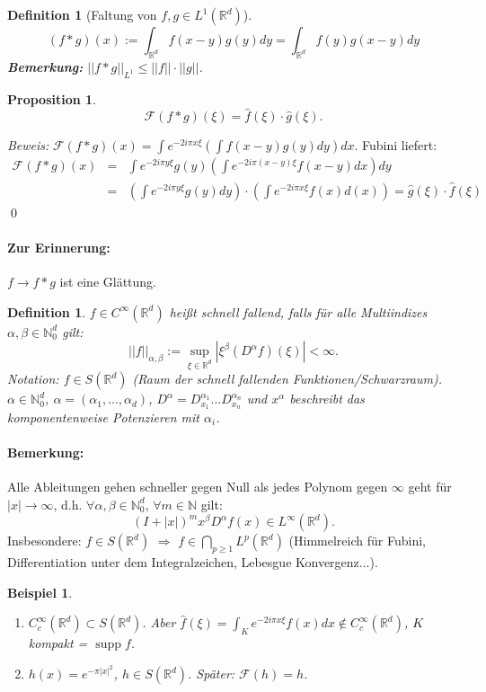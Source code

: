 \documentclass[12pt]{extreport} %
\newtheorem{Definition}[Satz]{Definition}
\newtheorem{Beispiel}[Satz]{Beispiel}
\newtheorem{Prop}[Satz]{Proposition}
\DeclareMathOperator{\supp}{supp}
\numberwithin{equation}{section}
\newcommand{\R}{\mathbb{R}} %
\newcommand{\N}{\mathbb{N}} %
\newcommand{\f}{\hat{f}}
\newcommand{\g}{\hat{g}}
\newcommand{\F}{\mathcal{F}}
\newcommand{\m}{\cdot}
\newcommand{\Bew}{\emph{Beweis: }}
\begin{document}
	\begin{Definition}[Faltung von $f,g\in L^1(\R^d)$]
		$$(f*g)(x):= \int_{\R^d}f(x-y)g(y)dy = \int_{\R^d}f(y) g(x-y) dy$$
		\textbf{Bemerkung:} $||f*g||_{L^1}\leq ||f||\m ||g||$.
	\end{Definition}
	
	\begin{Prop}
		$$\F(f*g)(\xi) = \f(\xi)\m \g(\xi).$$
	\end{Prop}
	
	\Bew $\F(f*g)(x) = \int e^{-2i\pi x\xi}(\int f(x-y)g(y)dy)dx$. Fubini liefert:
	\begin{eqnarray}
		\F(f*g)(x) &=& \int e^{-2i\pi y\xi}g(y) (\int e^{-2i\pi (x-y)\xi}f(x-y)dx)dy\nonumber\\
		&=&(\int e^{-2i\pi y\xi}g(y)dy)\m(\int e^{-2i\pi x\xi}f(x)d(x)) = \g(\xi)\m \f(\xi)\nonumber
	\end{eqnarray}
	\qed
	
	\paragraph{Zur Erinnerung:} $f\rightarrow f*g$ ist eine Glättung.
	
	\begin{Definition}
		$f\in C^{\infty}(\R^d)$ heißt schnell fallend, falls für alle Multiindizes $\alpha,\beta \in \N_0^d$ gilt: 
		$$||f||_{\alpha,\beta} := \sup_{\xi\in \R^d}|\xi^\beta(D^\alpha f)(\xi)| <\infty.$$
		Notation: $f\in S(\R^d)$ (Raum der schnell fallenden Funktionen/Schwarzraum). $\alpha\in \N_0^d$, $\alpha = (\alpha_1,...,\alpha_d)$, $D^\alpha = D_{x_1}^{\alpha_1}...D_{x_n}^{\alpha_n}$ und $x^\alpha$ beschreibt das komponentenweise Potenzieren mit $\alpha_i$.
	\end{Definition}
	
	\paragraph{Bemerkung:} Alle Ableitungen gehen schneller gegen Null als jedes Polynom gegen $\infty$ geht für $|x|\rightarrow \infty$, d.h. $\forall\alpha,\beta\in \N_0^d$, $\forall m\in \N$ gilt:
	$$(I+|x|)^m x^\beta D^\alpha f(x)\in L^\infty(\R^d).$$
	Insbesondere: $f\in S(\R^d)$ $\Rightarrow$ $f\in \bigcap_{p\geq 1} L^p(\R^d)$ (Himmelreich für Fubini, Differentiation unter dem Integralzeichen, Lebesgue Konvergenz...).
	
	\begin{Beispiel}
		~
		\begin{enumerate}
			\item[a)] $C_c^{\infty}(\R^d)\subset S(\R^d)$. Aber $\f(\xi) = \int_K e^{-2i\pi x\xi}f(x) dx\notin C_c^{\infty}(\R^d)$, $K$ kompakt = $\supp f$.
			\item[b)] $h(x) = e^{-\pi|x|^2}$, $h\in S(\R^d)$. Später: $\F(h) = h$.
		\end{enumerate}
	\end{Beispiel}
	
\end{document}
